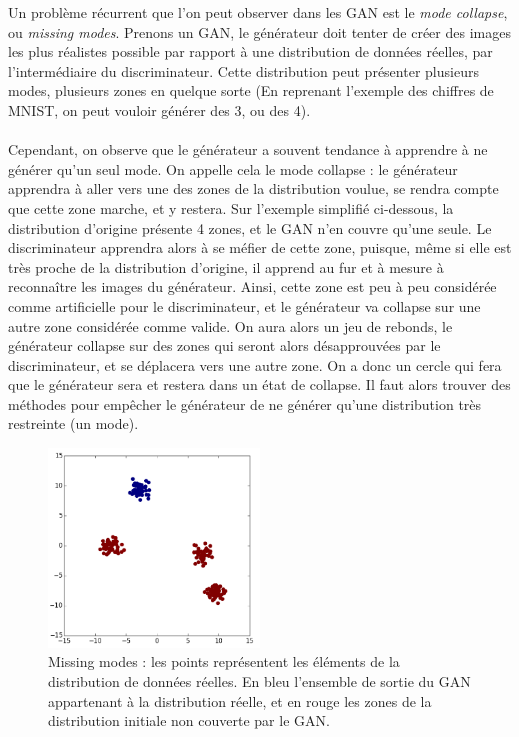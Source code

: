 Un problème récurrent que l'on peut observer dans les GAN est le \textit{mode collapse}, ou \textit{missing modes}. Prenons un GAN, le générateur doit tenter de créer des images les plus réalistes possible par rapport à une distribution de données réelles, par l'intermédiaire du discriminateur. Cette distribution peut présenter plusieurs modes, plusieurs zones en quelque sorte (En reprenant l'exemple des chiffres de MNIST, on peut vouloir générer des 3, ou des 4). 
\\ \\
Cependant, on observe que le générateur a souvent tendance à apprendre à ne générer qu'un seul mode. On appelle cela le mode collapse : le générateur apprendra à aller vers une des zones de la distribution voulue, se rendra compte que cette zone marche, et y restera. 
Sur l'exemple simplifié ci-dessous, la distribution d'origine présente 4 zones, et le GAN n'en couvre qu'une seule.
Le discriminateur apprendra alors à se méfier de cette zone, puisque, même si elle est très proche de la distribution d'origine, il apprend au fur et à mesure à reconnaître les images du générateur. Ainsi, cette zone est peu à peu considérée comme artificielle pour le discriminateur, et le générateur va collapse sur une autre zone considérée comme valide. On aura alors un jeu de rebonds, le générateur collapse sur des zones qui seront alors désapprouvées par le discriminateur, et se déplacera vers une autre zone. 
On a donc un cercle qui fera que le générateur sera et restera dans un état de collapse. 
Il faut alors trouver des méthodes pour empêcher le générateur de ne générer qu'une distribution très restreinte (un mode).

\begin{figure}[h]
\begin{center}
\includegraphics[width=0.5\textwidth]{images/missing_modes.png}\caption{Missing modes : les points représentent les éléments de la distribution de données réelles. En bleu l'ensemble de sortie du GAN appartenant à la distribution réelle, et en rouge les zones de la distribution initiale non couverte par le GAN.}
\end{center}
\end{figure} 

